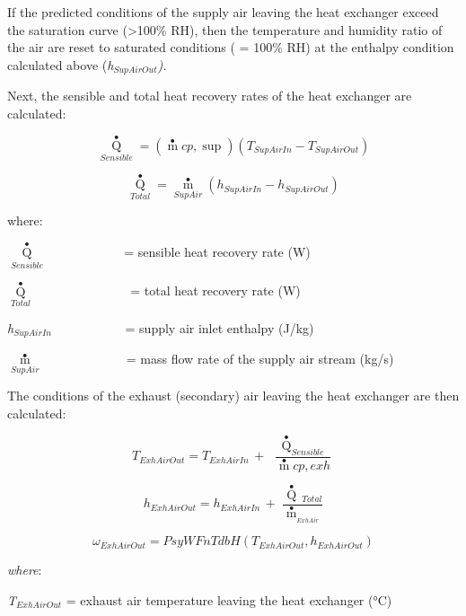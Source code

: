 If the predicted conditions of the supply air leaving the heat exchanger exceed the saturation curve (\textgreater{}100\% RH), then the temperature and humidity ratio of the air are reset to saturated conditions ( = 100\% RH) at the enthalpy condition calculated above (\emph{h\(_{SupAirOut}\)).}

Next, the sensible and total heat recovery rates of the heat exchanger are calculated:

\begin{equation}
{\mathop Q\limits^ \bullet_{Sensible}} = \left( {\mathop m\limits^ \bullet  cp,\sup } \right)({T_{SupAirIn}} - {T_{SupAirOut}})
\end{equation}

\begin{equation}
{\mathop Q\limits^ \bullet_{Total}} = {\mathop m\limits^ \bullet_{SupAir}}({h_{SupAirIn}} - {h_{SupAirOut}})
\end{equation}

where:

\({\mathop Q\limits^ \bullet_{Sensible}}\) ~~~~~~~~~~~ = sensible heat recovery rate (W)

\({\mathop Q\limits^ \bullet_{Total}}\) ~~~~~~~~~~~~~~ = total heat recovery rate (W)

\emph{h\(_{SupAirIn}\)}~~~~~~~~~~~ = supply air inlet enthalpy (J/kg)

\({\mathop m\limits^ \bullet_{SupAir}}\) ~~~~~~~~~~~~ = mass flow rate of the supply air stream (kg/s)

The conditions of the exhaust (secondary) air leaving the heat exchanger are then calculated:

\begin{equation}
{T_{ExhAirOut}} = {T_{ExhAirIn}}\, + \,\,\frac{{{{\mathop Q\limits^ \bullet  }_{Sensible}}}}{{\mathop m\limits^ \bullet  cp,exh}}
\end{equation}

\begin{equation}
{h_{ExhAirOut}} = {h_{ExhAirIn}}\, + \,\,\frac{{\mathop Q\limits^ \bullet  {\,_{Total}}}}{{{{\mathop m\limits^ \bullet  }_{_{ExhAir}}}}}
\end{equation}

\begin{equation}
{\omega_{ExhAirOut}} = PsyWFnTdbH({T_{ExhAirOut}},{h_{ExhAirOut}})
\end{equation}

\emph{where}:

\emph{T\(_{ExhAirOut}\)} = exhaust air temperature leaving the heat exchanger (°C)

